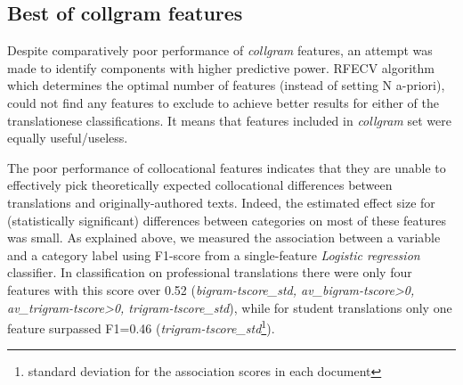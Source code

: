 \subsection{\label{ssec:best_collgram}Best of collgram features} 

Despite comparatively poor performance of \textit{collgram} features, an attempt was made to identify components with higher predictive power. \gls{RFECV} algorithm which determines the optimal number of features (instead of setting N a-priori), could not find any features to exclude to achieve better results for either of the translationese classifications. It means that features included in \textit{collgram} set were equally useful/useless. 



%

%
The poor performance of collocational features indicates that they are unable to effectively pick theoretically expected collocational differences between translations and originally-authored texts. Indeed, the estimated effect size for (statistically significant) differences between categories on most of these features was small. As explained above, we measured the association between a variable and a category label using F1-score from a single-feature \textit{Logistic regression} classifier. 
In classification on professional translations there were only four features with this score over 0.52 (\textit{bigram-tscore\_std, av\_bigram-tscore>0, av\_trigram-tscore>0, trigram-tscore\_std}), while for student translations only one feature surpassed F1=0.46 (\textit{trigram-tscore\_std}\footnote{standard deviation for the association scores in each document}). 

